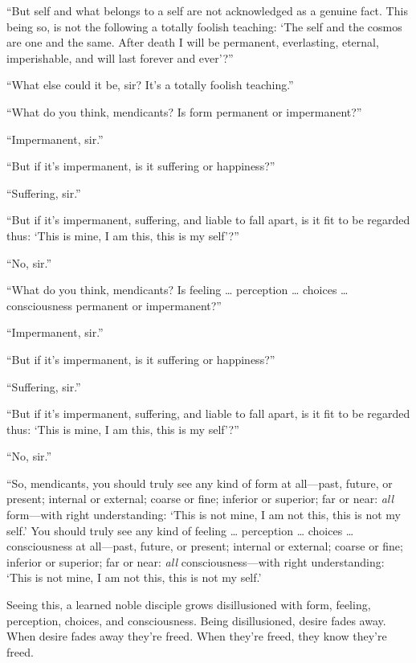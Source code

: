 \documentclass[12pt,openany]{book}%
\begin{document}
“But self and what belongs to a self are not acknowledged as a genuine fact. This being so, is not the following a totally foolish teaching: ‘The self and the cosmos are one and the same. After death I will be permanent, everlasting, eternal, imperishable, and will last forever and ever’?” 

“What else could it be, sir? It’s a totally foolish teaching.” 

“What do you think, mendicants? Is form permanent or impermanent?” 

“Impermanent, sir.” 

“But if it’s impermanent, is it suffering or happiness?” 

“Suffering, sir.” 

“But if it’s impermanent, suffering, and liable to fall apart, is it fit to be regarded thus: ‘This is mine, I am this, this is my self’?” 

“No, sir.” 

“What do you think, mendicants? Is feeling … perception … choices … consciousness permanent or impermanent?” 

“Impermanent, sir.” 

“But if it’s impermanent, is it suffering or happiness?” 

“Suffering, sir.” 

“But if it’s impermanent, suffering, and liable to fall apart, is it fit to be regarded thus: ‘This is mine, I am this, this is my self’?” 

“No, sir.” 

“So, mendicants, you should truly see any kind of form at all—past, future, or present; internal or external; coarse or fine; inferior or superior; far or near: \emph{all} form—with right understanding: ‘This is not mine, I am not this, this is not my self.’ You should truly see any kind of feeling … perception … choices … consciousness at all—past, future, or present; internal or external; coarse or fine; inferior or superior; far or near: \emph{all} consciousness—with right understanding: ‘This is not mine, I am not this, this is not my self.’ 

Seeing this, a learned noble disciple grows disillusioned with form, feeling, perception, choices, and consciousness. Being disillusioned, desire fades away. When desire fades away they’re freed. When they’re freed, they know they’re freed. 
\end{document}
